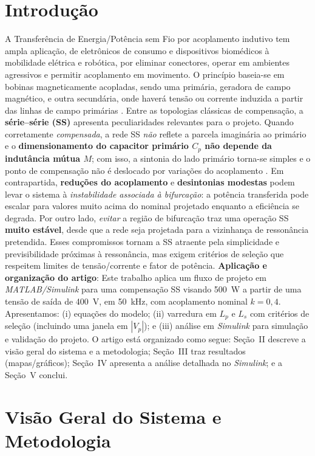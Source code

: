 \documentclass[conference]{IEEEtran}
\begin{document}
\section{Introdução}
A Transferência de Energia/Potência sem Fio por acoplamento indutivo tem ampla aplicação, de eletrônicos de consumo e dispositivos biomédicos à mobilidade elétrica e robótica, por eliminar conectores, operar em ambientes agressivos e permitir acoplamento em movimento. O princípio baseia-se em bobinas magneticamente acopladas, sendo uma primária, geradora de campo magnético, e outra secundária, onde haverá tensão ou corrente induzida a partir das linhas de campo primárias \cite{godoy2024wpt}.
Entre as topologias clássicas de compensação, a \textbf{série–série (SS)} apresenta peculiaridades relevantes para o projeto. Quando corretamente \emph{compensada}, a rede SS \emph{não} reflete a parcela imaginária ao primário e o \textbf{dimensionamento do capacitor primário \(C_p\) não depende da indutância mútua \(M\)}; com isso, a sintonia do lado primário torna-se simples e o ponto de compensação não é deslocado por variações do acoplamento \cite{godoy2024wpt}. Em contrapartida, \textbf{reduções do acoplamento} e \textbf{desintonias modestas} podem levar o sistema à \emph{instabilidade associada à bifurcação}: a potência transferida pode escalar para valores muito acima do nominal projetado enquanto a eficiência se degrada. Por outro lado, \emph{evitar} a região de bifurcação traz uma operação SS \textbf{muito estável}, desde que a rede seja projetada para a vizinhança de ressonância pretendida. Esses compromissos tornam a SS atraente pela simplicidade e previsibilidade próximas à ressonância, mas exigem critérios de seleção que respeitem limites de tensão/corrente e fator de potência.
\textbf{Aplicação e organização do artigo}: Este trabalho aplica um fluxo de projeto em \emph{MATLAB/Simulink} para uma compensação SS visando \SI{500}{\watt} a partir de uma tensão de saída de \SI{400}{\volt}, em \SI{50}{\kilo\hertz}, com acoplamento nominal $k{=}0{,}4$. Apresentamos: (i) equações do modelo; (ii) varredura em \(L_p\) e \(L_s\) com critérios de seleção (incluindo uma janela em $|V_p|$); e (iii) análise em \emph{Simulink} para simulação e validação do projeto. O artigo está organizado como segue: Seção~II descreve a visão geral do sistema e a metodologia; Seção~III traz resultados (mapas/gráficos); Seção~IV apresenta a análise detalhada no \emph{Simulink}; e a Seção~V conclui.
\section{Visão Geral do Sistema e Metodologia}
\end{document}
